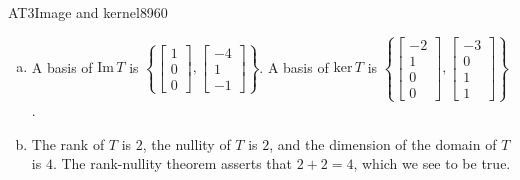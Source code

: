 \begin{exercise}{AT3}{Image and kernel}{8960}
\begin{exerciseAnswer}
\begin{enumerate}[(a)]
 
\item  

 A basis of \(\mathrm{Im}\,T\) is \(\left\{ \left[\begin{array}{c}
1 \\
0 \\
0
\end{array}\right] , \left[\begin{array}{c}
-4 \\
1 \\
-1
\end{array}\right] \right\}\). A basis of \(\mathrm{ker}\,T\) is \(\left\{ \left[\begin{array}{c}
-2 \\
1 \\
0 \\
0
\end{array}\right] , \left[\begin{array}{c}
-3 \\
0 \\
1 \\
1
\end{array}\right] \right\}\). 

 
\item  

 The rank of \(T\) is \(2\), the nullity of \(T\) is \(2\), and the dimension of the domain of \(T\) is \(4\). The rank-nullity theorem asserts that \(2+2=4\), which we see to be true. 

 
\end{enumerate}

     \end{exerciseAnswer}
 \end{exercise}


